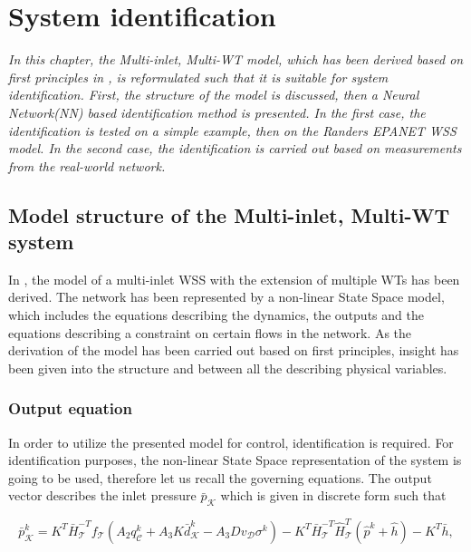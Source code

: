 \chapter{System identification}
\label{identification_design}

\emph{In this chapter, the Multi-inlet, Multi-WT model, which has been derived based on first principles in , is reformulated such that it is suitable for system identification. First, the structure of the model is discussed, then a Neural Network(NN) based identification method is presented. In the first case, the identification is tested on a simple example, then on the Randers EPANET WSS model. In the second case, the identification is carried out based on measurements from the real-world network.}

\section{Model structure of the Multi-inlet, Multi-WT system}
\label{model_structure_of_the_multi_inlet_multi_WT_system}

In , the model of a multi-inlet WSS with the extension of multiple WTs has been derived. The network has been represented by a non-linear State Space model, which includes the equations describing the dynamics, the outputs and the equations describing a constraint on certain flows in the network. As the derivation of the model has been carried out based on first principles, insight has been given into the structure and between all the describing physical variables. 

\subsection{Output equation}
\label{output_eq_identification}

In order to utilize the presented model for control, identification is required. For identification purposes, the non-linear State Space representation of the system is going to be used, therefore let us recall the governing equations. The output vector describes the inlet pressure $\bar{p}_{\mathcal{K}}$ which is given in discrete form such that

\begin{equation}
  \label{recall_output_eq}
  \bar{p}^{k}_{\mathcal{K}} = K^T \bar{H}^{-T}_{\mathcal{T}}f_{\mathcal{T}}(A_2 q^{k}_{\mathcal{C}} + A_3 K \bar{d}^{k}_{\mathcal{K}} - A_3 D v_{\mathcal{D}} \sigma^{k}) - K^T\bar{H}^{-T}_{\mathcal{T}}\hat{H}^{T}_{\mathcal{T}} (\hat{p}^{k} + \hat{h}) - K^T\bar{h} ,
\end{equation} 

